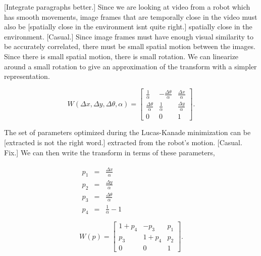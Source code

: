 \documentclass[letterpaper, 10 pt, conference]{ieeeconf}
\newcommand{\comment}[1]{{\color{red}[#1]}}
\begin{document}
\comment{Integrate paragraphs better.} Since we are looking at video from a robot which has smooth movements, image frames that are temporally close in the video must also be \comment{spatially close in the environment isnt quite right.} spatially close in the environment. 
\comment{Casual.} Since image frames must have enough visual similarity to be accurately correlated, there must be small spatial motion between the images. Since there is small spatial motion, there is small rotation. We can linearize around a small rotation to give an approximation of the transform with a simpler representation.



\begin{equation*}
W(\Delta x, \Delta y, \Delta \theta, \alpha) = \begin{bmatrix} \frac{1}{\alpha} & -\frac{\Delta \theta}{\alpha} & \frac{\Delta x}{\alpha} \\ \frac{\Delta \theta}{\alpha} & \frac{1}{\alpha} & \frac{\Delta y}{\alpha} \\ 0 & 0 & 1 \end{bmatrix}.
\end{equation*}

The set of parameters optimized during the Lucas-Kanade minimization can be \comment{extracted is not the right word.} extracted from the robot's motion. 
\comment{Casual. Fix.} We can then write the transform in terms of these parameters,


\begin{eqnarray}
\begin{split} \label{eq:warp_param_conversion}
p_1 &=& \frac{\Delta x}{\alpha}\\
p_2 &=& \frac{\Delta y}{\alpha}\\
p_3 &=& \frac{\Delta \theta}{\alpha}\\
p_4 &=& \frac{1}{\alpha} - 1\\
\end{split}
\\ \label{eq:param_warp}
W(p) = \begin{bmatrix} 1+p_4 & -p_3 & p_1 \\ p_3 & 1+p_4 & p_2 \\ 0 & 0 & 1 \end{bmatrix}.
\end{eqnarray}
\end{document}
